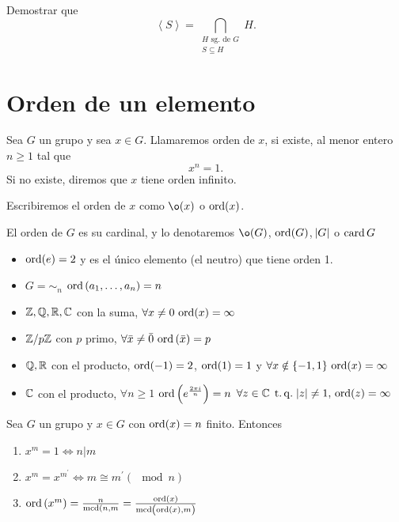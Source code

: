 \begin{ej}
    Demostrar que
    \[
        \left<S\right> = \bigcap_{\substack{H \text{ sg. de } G \\ S \subseteq H}} H.
    \]
\end{ej}

\section{Orden de un elemento}

\begin{defi}[orden]
    Sea $G$ un grupo y sea $x \in G$. Llamaremos orden de $x$, si existe, al menor entero $n \geq 1$ tal que
    \[
        x^n = 1.
    \]
    Si no existe, diremos que $x$ tiene orden infinito.
\end{defi}

\begin{obs}
    Escribiremos el orden de $x$ como $\o(x)$ o $\operatorname{ord}(x)$.
\end{obs}

\begin{obs}
    El orden de $G$ es su cardinal, y lo denotaremos $\o(G)$, $\operatorname{ord}(G)$, $\abs{G}$ o $\operatorname{card}{G}$
\end{obs}

\begin{example}
    \begin{itemize}
        \item $\operatorname{ord}(e) = 2$ y es el único elemento (el neutro) que tiene orden 1.
        \item $G = \sim_n$ $\operatorname{ord}\left( a_1, \dots, a_n \right) = n$
        \item $\mathbb{Z}, \mathbb{Q}, \mathbb{R}, \mathbb{C}$ con la suma, $\forall x \neq 0 \, \operatorname{ord}(x) = \infty$
        \item $\mathbb{Z}/p\mathbb{Z}$ con $p$ primo, $\forall \bar{x} \neq \bar{0} \, \operatorname{ord}\left( \bar{x} \right) = p$
        \item $\mathbb{Q}, \mathbb{R}$ con el producto, $\operatorname{ord}(-1) = 2$, $\operatorname{ord}(1) = 1$ y
            $\forall x \notin \left\{-1, 1\right\} \, \operatorname{ord}(x) = \infty$
        \item $\mathbb{C}$ con el producto, $\forall n \geq 1$ $\operatorname{ord}\left( e^{\frac{2 \pi i}{n}} \right) = n$
            $\forall z \in \mathbb{C} \operatorname{\;t.q.\;} \abs{z} \neq 1, \, \operatorname{ord}(z) = \infty$
    \end{itemize}
\end{example}

\begin{lema}
    Sea $G$ un grupo y $x \in G$ con $\operatorname{ord}(x) = n$ finito. Entonces
    \begin{enumerate}
        \item $x^m = 1 \iff n \vert m$
        \item $x^m = x^{m^\prime} \iff m \cong m^\prime (\mod n)$
        \item $\operatorname{ord}\left( x^m \right) = \frac{n}{\operatorname{mcd}(n, m} = \frac{\operatorname{ord}(x)}{\operatorname{mcd}\left( \operatorname{ord}(x), m \right)}$
    \end{enumerate}
\end{lema}

